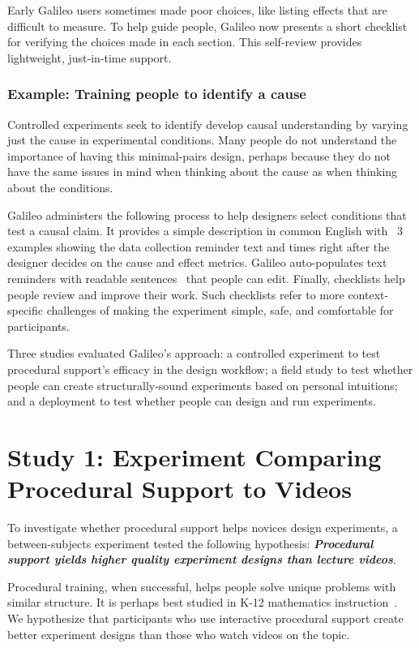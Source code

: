 Early Galileo users sometimes made poor choices, like listing effects that are difficult to measure. To help guide people, Galileo now presents a short checklist for verifying the choices made in each section. This self-review provides lightweight, just-in-time support.

\subsubsection{Example: Training people to identify a cause}
Controlled experiments seek to identify develop causal understanding by varying just the cause in experimental conditions. Many people do not understand the importance of having this minimal-pairs design, perhaps because they do not have the same issues in mind when thinking about the cause as when thinking about the conditions.

Galileo administers the following process to help designers select conditions that test a causal claim. It provides a simple description in common English with ~3 examples showing the data collection reminder text and times right after the designer decides on the cause and effect metrics. Galileo auto-populates text reminders with readable sentences~\cite{Levy2013} that people can edit. Finally, checklists help people review and improve their work. Such checklists refer to more context-specific challenges of making the experiment simple, safe, and comfortable for participants.
 
Three studies evaluated Galileo's approach: a controlled experiment to test procedural support's efficacy in the design workflow; a field study to test whether people can create structurally-sound experiments based on personal intuitions; and a deployment to test whether people can design and run experiments. 

\section{Study 1: Experiment Comparing Procedural Support to Videos}
To investigate whether procedural support helps novices design experiments, a between-subjects experiment tested the following hypothesis: \textbf{\textit{Procedural support yields higher quality experiment designs than lecture videos}}. 

Procedural training, when successful, helps people solve unique problems with similar structure. It is perhaps best studied in K-12 mathematics instruction~\cite{Rittle-Johnson1999}. We hypothesize that participants who use interactive procedural support create better experiment designs than those who watch videos on the topic. 

